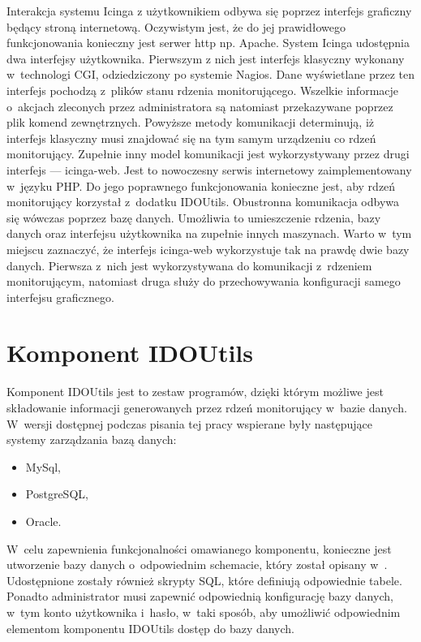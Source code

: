 Interakcja systemu Icinga z użytkownikiem odbywa się poprzez interfejs
graficzny będący stroną internetową. Oczywistym jest, że do jej
prawidłowego funkcjonowania konieczny jest serwer http
np. Apache. System Icinga udostępnia dwa interfejsy
użytkownika. Pierwszym z nich jest interfejs klasyczny wykonany
w~technologi CGI, odziedziczony po systemie Nagios. Dane wyświetlane
przez ten interfejs pochodzą z~plików stanu rdzenia
monitorującego. Wszelkie informacje o~akcjach zleconych przez
administratora są natomiast przekazywane poprzez plik komend
zewnętrznych. Powyższe metody komunikacji determinują, iż interfejs
klasyczny musi znajdować się na tym samym urządzeniu co rdzeń
monitorujący. Zupełnie inny model komunikacji jest wykorzystywany
przez drugi interfejs --- icinga-web. Jest to nowoczesny serwis
internetowy zaimplementowany w~języku PHP. Do jego poprawnego
funkcjonowania konieczne jest, aby rdzeń monitorujący korzystał
z~dodatku IDOUtils. Obustronna komunikacja odbywa się wówczas poprzez
bazę danych. Umożliwia to umieszczenie rdzenia, bazy danych oraz
interfejsu użytkownika na zupełnie innych maszynach. Warto w~tym
miejscu zaznaczyć, że interfejs icinga-web wykorzystuje tak na prawdę
dwie bazy danych. Pierwsza z~nich jest wykorzystywana do komunikacji
z~rdzeniem monitorującym, natomiast druga służy do przechowywania
konfiguracji samego interfejsu graficznego.


\section[Komponent IDOUtils][Komponent IDOUtils]{Komponent IDOUtils}
\label{sec:IDOUtils}

Komponent IDOUtils jest to zestaw programów, dzięki którym możliwe jest
składowanie informacji generowanych przez rdzeń monitorujący w~bazie
danych. W~wersji dostępnej podczas pisania tej pracy wspierane były
następujące systemy zarządzania bazą danych:

\begin{itemize}
\item MySql,
\item PostgreSQL,
\item Oracle.
\end{itemize}

W~celu zapewnienia funkcjonalności omawianego komponentu, konieczne
jest utworzenie bazy danych o~odpowiednim schemacie, który został
opisany w~\cite[669-750]{www:IcingaDoc}. Udostępnione zostały również
skrypty SQL, które definiują odpowiednie tabele. Ponadto administrator
musi zapewnić odpowiednią konfigurację bazy danych, w~tym konto
użytkownika i~hasło, w~taki sposób, aby umożliwić odpowiednim
elementom komponentu IDOUtils dostęp do bazy danych.

